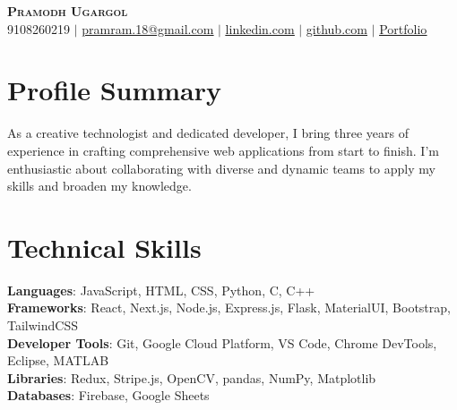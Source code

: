 \documentclass[letterpaper,11pt]{article}
\begin{document}
\begin{center}
    \textbf{\Huge \scshape Pramodh Ugargol} \\ \vspace{1pt}
    \small 9108260219 $|$ \href{mailto:pramram.18@gmail.com}{\underline{pramram.18@gmail.com}} $|$ 
    \href{https://linkedin.com/in/pramodhugargol18}{\underline{linkedin.com}} $|$
    \href{https://github.com/PRAMOMDHUGARGOL/}{\underline{github.com}} $|$ \href{https://portfolio-pramodh-ugargol.vercel.app/}{\underline{Portfolio}}
\end{center}

\section{Profile Summary}
As a creative technologist and dedicated developer, I bring three years of experience in crafting comprehensive web applications from start to finish. I'm enthusiastic about collaborating with diverse and dynamic teams to apply my skills and broaden my knowledge.



\section{Technical Skills}
 \begin{itemize}[leftmargin=0.15in, label={}]
    \small{\item{
     \textbf{Languages}{: JavaScript, HTML, CSS, Python, C, C++ } \\
     \textbf{Frameworks}{: React, Next.js, Node.js, Express.js, Flask, MaterialUI, Bootstrap, TailwindCSS} \\
     \textbf{Developer Tools}{: Git, Google Cloud Platform, VS Code, Chrome DevTools, Eclipse, MATLAB} \\
    \textbf{Libraries}{: Redux, Stripe.js, OpenCV, pandas, NumPy, Matplotlib}\\
    \textbf{Databases}{: Firebase, Google Sheets} \\
    }}
 \end{itemize}

\end{document}
